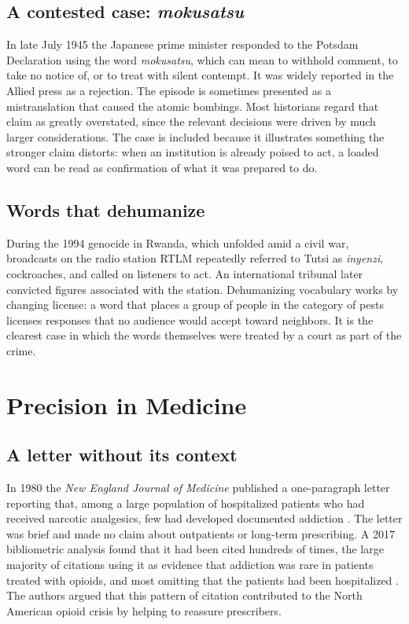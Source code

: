 \documentclass[11pt,a4paper]{article}
\theoremstyle{plain}
\theoremstyle{definition}
\theoremstyle{remark}
\begin{document}
\subsection{A contested case: \emph{mokusatsu}}

In late July 1945 the Japanese prime minister responded to the Potsdam Declaration using the word \emph{mokusatsu}, which can mean to withhold comment, to take no notice of, or to treat with silent contempt. It was widely reported in the Allied press as a rejection. The episode is sometimes presented as a mistranslation that caused the atomic bombings. Most historians regard that claim as greatly overstated, since the relevant decisions were driven by much larger considerations. The case is included because it illustrates something the stronger claim distorts: when an institution is already poised to act, a loaded word can be read as confirmation of what it was prepared to do.

\subsection{Words that dehumanize}

During the 1994 genocide in Rwanda, which unfolded amid a civil war, broadcasts on the radio station RTLM repeatedly referred to Tutsi as \emph{inyenzi}, cockroaches, and called on listeners to act. An international tribunal later convicted figures associated with the station. Dehumanizing vocabulary works by changing license: a word that places a group of people in the category of pests licenses responses that no audience would accept toward neighbors. It is the clearest case in which the words themselves were treated by a court as part of the crime.

\section{Precision in Medicine}

\subsection{A letter without its context}

In 1980 the \emph{New England Journal of Medicine} published a one-paragraph letter reporting that, among a large population of hospitalized patients who had received narcotic analgesics, few had developed documented addiction \cite{porter1980}. The letter was brief and made no claim about outpatients or long-term prescribing. A 2017 bibliometric analysis found that it had been cited hundreds of times, the large majority of citations using it as evidence that addiction was rare in patients treated with opioids, and most omitting that the patients had been hospitalized \cite{leung2017}. The authors argued that this pattern of citation contributed to the North American opioid crisis by helping to reassure prescribers.
\end{document}
